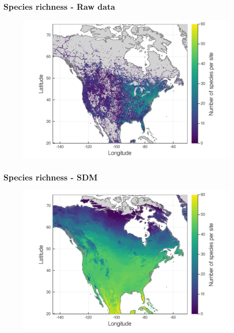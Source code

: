 \documentclass[10pt]{beamer}
\begin{document}
\begin{frame}
  \frametitle{Species richness - Raw data}
  \begin{figure}
    \centering
    \hspace*{-0cm}\includegraphics[scale=0.17]{fig/03_raw_richness.png}
  \end{figure}
\end{frame}

\begin{frame}
  \frametitle{Species richness - SDM}
  \begin{figure}
    \centering
    \hspace*{-0cm}\includegraphics[scale=0.17]{fig/03_sdm_richness.png}
  \end{figure}
\end{frame}
\end{document}
